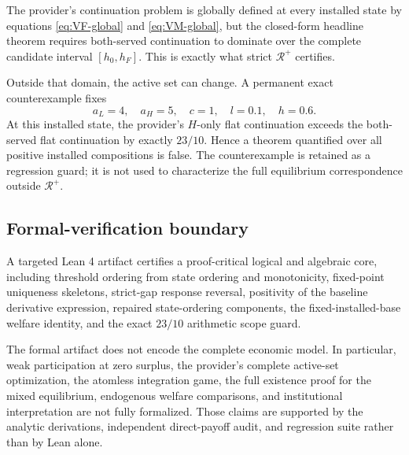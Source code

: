 The provider's continuation problem is globally defined at every installed state by equations \eqref{eq:VF-global} and \eqref{eq:VM-global}, but the closed-form headline theorem requires both-served continuation to dominate over the complete candidate interval $[h_0,h_F]$. This is exactly what strict $\mathcal R^+$ certifies.

Outside that domain, the active set can change. A permanent exact counterexample fixes
\begin{equation}
 a_L=4,\quad a_H=5,\quad c=1,\quad l=0.1,\quad h=0.6.
 \label{eq:scope-counterexample}
\end{equation}
At this installed state, the provider's $H$-only flat continuation exceeds the both-served flat continuation by exactly $23/10$. Hence a theorem quantified over all positive installed compositions is false. The counterexample is retained as a regression guard; it is not used to characterize the full equilibrium correspondence outside $\mathcal R^+$.

\subsection{Formal-verification boundary}

A targeted Lean 4 artifact certifies a proof-critical logical and algebraic core, including threshold ordering from state ordering and monotonicity, fixed-point uniqueness skeletons, strict-gap response reversal, positivity of the baseline derivative expression, repaired state-ordering components, the fixed-installed-base welfare identity, and the exact $23/10$ arithmetic scope guard.

The formal artifact does not encode the complete economic model. In particular, weak participation at zero surplus, the provider's complete active-set optimization, the atomless integration game, the full existence proof for the mixed equilibrium, endogenous welfare comparisons, and institutional interpretation are not fully formalized. Those claims are supported by the analytic derivations, independent direct-payoff audit, and regression suite rather than by Lean alone.
